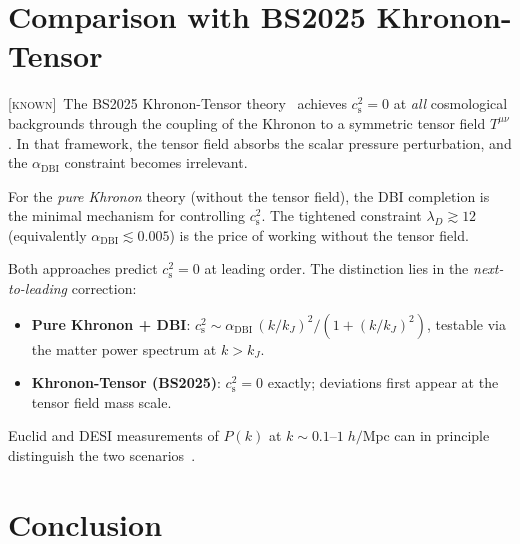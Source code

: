 \documentclass[prd,twocolumn,superscriptaddress,longbibliography,floatfix]{revtex4-2}
\newcommand{\cs}{c_{\mathrm{s}}}
\newcommand{\known}{\textsc{[known]}}
\begin{document}
\section{Comparison with BS2025 Khronon-Tensor}
\label{sec:BS2025}

\known\ The BS2025 Khronon-Tensor
theory~\cite{BS2025} achieves $\cs^2 = 0$ at
\emph{all} cosmological backgrounds through the
coupling of the Khronon to a symmetric tensor field
$T^{\mu\nu}$.  In that framework, the tensor field
absorbs the scalar pressure perturbation, and the
$\alpha_{\mathrm{DBI}}$ constraint becomes irrelevant.

For the \emph{pure Khronon} theory (without the
tensor field), the DBI completion is the minimal
mechanism for controlling $\cs^2$.  The
tightened constraint $\lambda_D \gtrsim 12$
(equivalently $\alpha_{\mathrm{DBI}} \lesssim 0.005$)
is the price of working without the tensor field.

Both approaches predict $\cs^2 = 0$ at leading
order.  The distinction lies in the
\emph{next-to-leading} correction:
\begin{itemize}
\item \textbf{Pure Khronon + DBI}:
$\cs^2 \sim \alpha_{\mathrm{DBI}}\,(k/k_J)^2
/(1 + (k/k_J)^2)$,
testable via the matter power spectrum at
$k > k_J$.
\item \textbf{Khronon-Tensor (BS2025)}:
$\cs^2 = 0$ exactly; deviations first appear
at the tensor field mass scale.
\end{itemize}
Euclid and DESI measurements of $P(k)$ at
$k \sim 0.1$--$1\;h/\mathrm{Mpc}$ can in
principle distinguish the two
scenarios~\cite{Euclid2020}.


\section{Conclusion}
\label{sec:conclusion}
\end{document}
